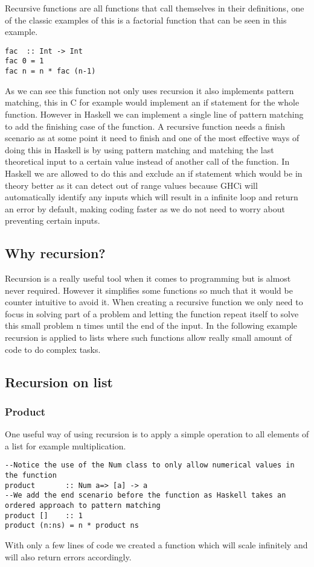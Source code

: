 \documentclass[12pt, oneside]{article}
\begin{document}
Recursive functions are all functions that call themselves in their definitions, one of the classic examples of this is a factorial function that can be seen in this example.
\begin{lstlisting}
fac  :: Int -> Int
fac 0 = 1
fac n = n * fac (n-1)
\end{lstlisting}
As we can see this function not only uses recursion it also implements pattern matching, this in C for example would implement an if statement for the whole function. However in Haskell we can implement a single line of pattern matching to add the finishing case of the function.
A recursive function needs a finish scenario as at some point it need to finish and one of the most effective ways of doing this in Haskell is by using pattern matching and matching the last theoretical input to a certain value instead of another call of the function.
In Haskell we are allowed to do this and exclude an if statement which would be in theory better as it can detect out of range values because GHCi will automatically identify any inputs which will result in a infinite loop and return an error by default, making coding faster as we do not need to worry about preventing certain inputs.

\subsection{Why recursion?}
Recursion is a really useful tool when it comes to programming but is almost never required. However it simplifies some functions so much that it would be counter intuitive to avoid it. When creating a recursive function we only need to focus in solving part of a problem and letting the function repeat itself to solve this small problem n times until the end of the input.
In the following example recursion is applied to lists where such functions allow really small amount of code to do complex tasks.

\subsection{Recursion on list}
\subsubsection{Product}
One useful way of using recursion is to apply a simple operation to all elements of a list for example multiplication.
\begin{lstlisting}
--Notice the use of the Num class to only allow numerical values in the function
product       :: Num a=> [a] -> a
--We add the end scenario before the function as Haskell takes an ordered approach to pattern matching 
product []    :: 1
product (n:ns) = n * product ns 
\end{lstlisting}
With only a few lines of code we created a function which will scale infinitely and will also return errors accordingly.
\end{document}

